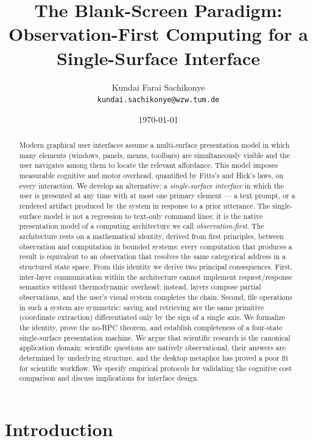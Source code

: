 \documentclass[11pt,a4paper]{article}
\title{The Blank-Screen Paradigm:\\
Observation-First Computing for a Single-Surface Interface}
\author{Kundai Farai Sachikonye\\
\texttt{kundai.sachikonye@wzw.tum.de}}
\date{\today}
\theoremstyle{definition}
\theoremstyle{remark}
\begin{document}
\maketitle

\begin{abstract}
Modern graphical user interfaces assume a multi-surface presentation model in which many elements (windows, panels, menus, toolbars) are simultaneously visible and the user navigates among them to locate the relevant affordance. This model imposes measurable cognitive and motor overhead, quantified by Fitts's and Hick's laws, on every interaction. We develop an alternative: a \emph{single-surface interface} in which the user is presented at any time with at most one primary element --- a text prompt, or a rendered artifact produced by the system in response to a prior utterance. The single-surface model is not a regression to text-only command lines; it is the native presentation model of a computing architecture we call \emph{observation-first}. The architecture rests on a mathematical identity, derived from first principles, between observation and computation in bounded systems: every computation that produces a result is equivalent to an observation that resolves the same categorical address in a structured state space. From this identity we derive two principal consequences. First, inter-layer communication within the architecture cannot implement request/response semantics without thermodynamic overhead; instead, layers compose partial observations, and the user's visual system completes the chain. Second, file operations in such a system are symmetric: saving and retrieving are the same primitive (coordinate extraction) differentiated only by the sign of a single axis. We formalize the identity, prove the no-RPC theorem, and establish completeness of a four-state single-surface presentation machine. We argue that scientific research is the canonical application domain: scientific questions are natively observational, their answers are determined by underlying structure, and the desktop metaphor has proved a poor fit for scientific workflow. We specify empirical protocols for validating the cognitive cost comparison and discuss implications for interface design.
\end{abstract}

\section{Introduction}
\label{sec:intro}
\end{document}

